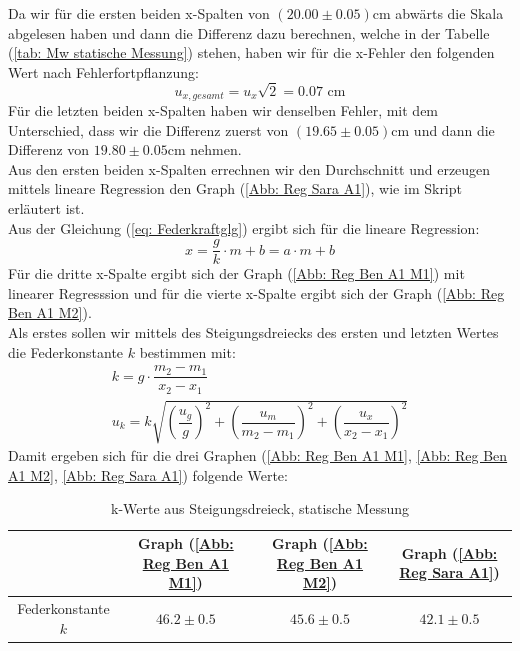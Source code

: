 \documentclass[bibliography=totocnumbered]{scrartcl}
\begin{document}
	Da wir für die ersten beiden x-Spalten von $ (20.00\pm 0.05) $cm abwärts die Skala abgelesen haben und dann die Differenz dazu berechnen, welche in der Tabelle (\ref{tab: Mw statische Messung}) stehen, haben wir für die x-Fehler den folgenden Wert nach Fehlerfortpflanzung:
	\begin{equation}
		u_{x,gesamt}=u_{x}\sqrt{2}=0.07\text{ cm}
	\end{equation}
	Für die letzten beiden x-Spalten haben wir denselben Fehler, mit dem Unterschied, dass wir die Differenz zuerst von $ (19.65\pm 0.05) $cm und dann die Differenz von $ 19.80\pm 0.05 $cm nehmen.\\
	Aus den ersten beiden x-Spalten errechnen wir den Durchschnitt und erzeugen mittels lineare Regression den Graph (\ref{Abb: Reg Sara A1}), wie im Skript\smartcite{MullerPG.2007b}
	erläutert ist. \\
	Aus der Gleichung (\ref{eq: Federkraftglg}) ergibt sich für die lineare Regression:
	\begin{equation}\label{eq: lineare Regression A1}
		x=\dfrac{g}{k}\cdot m+b=a\cdot m+b
	\end{equation}
	Für die dritte x-Spalte ergibt sich der Graph (\ref{Abb: Reg Ben A1 M1}) mit linearer Regresssion und für die vierte x-Spalte ergibt sich der Graph (\ref{Abb: Reg Ben A1 M2}).\\
	Als erstes sollen wir mittels des Steigungsdreiecks des ersten und letzten Wertes die Federkonstante $ k $ bestimmen mit:
	\begin{align}\label{eq: Steigungsdreieck A1}
		k=g \cdot \dfrac{m_{2}-m_{1}}{x_{2}-x_{1}}\\
		u_{k}=k\sqrt{\left(\dfrac{u_{g}}{g}\right)^{2}+\left(\dfrac{u_{m}}{m_{2}-m_{1}}\right)^{2}+\left(\dfrac{u_{x}}{x_{2}-x_{1}}\right)^{2}}
	\end{align}
	Damit ergeben sich für die drei Graphen (\ref{Abb: Reg Ben A1 M1}, \ref{Abb: Reg Ben A1 M2}, \ref{Abb: Reg Sara A1}) folgende Werte:
	
	\begin{table}[ht!]
		\centering
		\caption{k-Werte aus Steigungsdreieck, statische Messung}
		\begin{tabular}{|c|c|c|c|}
			\hline
			& Graph (\ref{Abb: Reg Ben A1 M1}) & Graph (\ref{Abb: Reg Ben A1 M2}) & Graph (\ref{Abb: Reg Sara A1}) \\
			\hline
			Federkonstante $ k $ & $ 46.2\pm 0.5 $ & $ 45.6\pm 0.5 $ & $ 42.1\pm 0.5  $ \\
			\hline
		\end{tabular}
		\label{tab: Fk, Steigungsdreieck, A1}
	\end{table}
\end{document}
